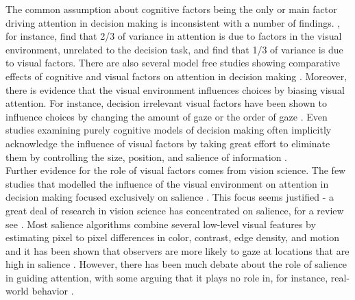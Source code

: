 The common assumption about cognitive factors being the only or main factor driving attention in decision making is inconsistent with a number of findings. \cite{vanderlans2008}, for instance, find that 2/3 of variance in attention is due to factors in the visual environment, unrelated to the decision task, and \cite{towal2013a} find that 1/3 of variance is due to visual factors. There are also several model free studies showing comparative effects of cognitive and visual factors on attention in decision making \citep{gidloef2017a, orquin2015a, orquin2019a}. Moreover, there is evidence that the visual environment influences choices by biasing visual attention. For instance, decision irrelevant visual factors have been shown to influence choices by changing the amount of gaze \citep{peschel2019, chandon2009a} or the order of gaze \citep{reeck2017a}. Even studies examining purely cognitive models of decision making often implicitly acknowledge the influence of visual factors by taking great effort to eliminate them by controlling the size, position, and salience of information \citep{brandstatter2014, gloeckner2011a, perkovic2018}.\\

Further evidence for the role of visual factors comes from vision science. The few studies that modelled the influence of the visual environment on attention in decision making focused exclusively on salience \citep{chen2013,navalpakkam2010, towal2013a}. This focus seems justified - a great deal of research in vision science has concentrated on salience, for a review see \cite{borji2012a}. Most salience algorithms combine several low-level visual features by estimating pixel to pixel differences in color, contrast, edge density, and motion and it has been shown that observers are more likely to gaze at locations that are high in salience \citep{itti2000}. However, there has been much debate about the role of salience in guiding attention, with some arguing that it plays no role in, for instance, real-world behavior \citep{tatler2011a}.\\


